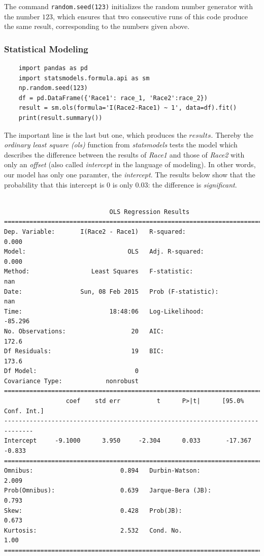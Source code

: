 The command \lstinline{random.seed(123)} initializes the random number generator with the number $123$, which ensures that two consecutive runs of this code produce the same result, corresponding to the numbers given above.

\subsubsection{Statistical Modeling}

\begin{lstlisting}
    import pandas as pd
    import statsmodels.formula.api as sm
    np.random.seed(123)
    df = pd.DataFrame({'Race1': race_1, 'Race2':race_2})
    result = sm.ols(formula='I(Race2-Race1) ~ 1', data=df).fit()
    print(result.summary())
\end{lstlisting}

The important line is the last but one, which produces the $results$. Thereby the \emph{ordinary least square (ols)} function from \emph{statsmodels} tests the model which describes the difference between the results of \emph{Race1} and those of \emph{Race2} with only an \emph{offset} (also called \emph{intercept} in the language of modeling). In other words, our model has only one paramter, the \emph{intercept}. The results below show that the probability that this intercept is 0 is only 0.03: the difference is \emph{significant}.

 \small\begin{lstlisting}

                             OLS Regression Results
==============================================================================
Dep. Variable:       I(Race2 - Race1)   R-squared:                       0.000
Model:                            OLS   Adj. R-squared:                  0.000
Method:                 Least Squares   F-statistic:                       nan
Date:                Sun, 08 Feb 2015   Prob (F-statistic):                nan
Time:                        18:48:06   Log-Likelihood:                -85.296
No. Observations:                  20   AIC:                             172.6
Df Residuals:                      19   BIC:                             173.6
Df Model:                           0
Covariance Type:            nonrobust
==============================================================================
                 coef    std err          t      P>|t|      [95.0% Conf. Int.]
------------------------------------------------------------------------------
Intercept     -9.1000      3.950     -2.304      0.033       -17.367    -0.833
==============================================================================
Omnibus:                        0.894   Durbin-Watson:                   2.009
Prob(Omnibus):                  0.639   Jarque-Bera (JB):                0.793
Skew:                           0.428   Prob(JB):                        0.673
Kurtosis:                       2.532   Cond. No.                         1.00
==============================================================================
\end{lstlisting}
\normalsize

